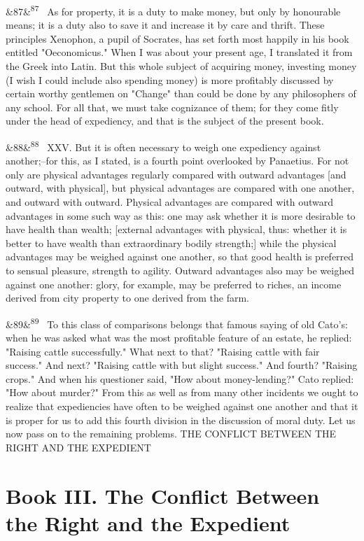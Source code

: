 \documentclass[12pt]{article}
\newcommand{\para}[1][]{\par\noindent\ifx&#1&\else\textsuperscript{\footnotesize #1}~\fi}
\begin{document}
\para[87] As for property, it is a duty to make money, but only by honourable means; it is a duty also to save it and increase it by care and thrift. These principles Xenophon, a pupil of Socrates, has set forth most happily in his book entitled "Oeconomicus." When I was about your present age, I translated it from the Greek into Latin. But this whole subject of acquiring money, investing money (I wish I could include also spending money) is more profitably discussed by certain worthy gentlemen on "Change" than could be done by any philosophers of any school. For all that, we must take cognizance of them; for they come fitly under the head of expediency, and that is the subject of the present book.

\para[88] XXV. But it is often necessary to weigh one expediency against another;--for this, as I stated, is a fourth point overlooked by Panaetius. For not only are physical advantages regularly compared with outward advantages [and outward, with physical], but physical advantages are compared with one another, and outward with outward. Physical advantages are compared with outward advantages in some such way as this: one may ask whether it is more desirable to have health than wealth; [external advantages with physical, thus: whether it is better to have wealth than extraordinary bodily strength;] while the physical advantages may be weighed against one another, so that good health is preferred to sensual pleasure, strength to agility. Outward advantages also may be weighed against one another: glory, for example, may be preferred to riches, an income derived from city property to one derived from the farm.

\para[89] To this class of comparisons belongs that famous saying of old Cato's: when he was asked what was the most profitable feature of an estate, he replied: "Raising cattle successfully." What next to that? "Raising cattle with fair success." And next? "Raising cattle with but slight success." And fourth? "Raising crops." And when his questioner said, "How about money-lending?" Cato replied: "How about murder?" From this as well as from many other incidents we ought to realize that expediencies have often to be weighed against one another and that it is proper for us to add this fourth division in the discussion of moral duty. Let us now pass on to the remaining problems. THE CONFLICT BETWEEN THE RIGHT AND THE EXPEDIENT

\section*{Book III. The Conflict Between the Right and the Expedient}
\end{document}
